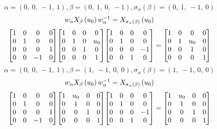 \documentclass[11pt]{article}
\theoremstyle{definition}
\begin{document}
\[
\alpha = \left( 0, \  0, \  -1, \  1\right), \beta = \left( 0, \  1, \  0, \  -1\right), \sigma_{\alpha}(\beta) = \left( 0, \  1, \  -1, \  0\right)
\]
\[
\scaletoalign{\textwidth}{w_{\alpha} X_{\beta}\left(u_{0}\right) w_{\alpha}^{-1} = X_{\sigma_{\alpha}\left(\beta\right)}\left(u_{0}\right)}
\]
\[
\scaletoalign{\textwidth}{{\left[\begin{matrix}1 & 0 & 0 & 0\\0 & 1 & 0 & 0\\0 & 0 & 0 & 1\\0 & 0 & -1 & 0\end{matrix}\right]} {\left[\begin{matrix}1 & 0 & 0 & 0\\0 & 1 & 0 & u_{0}\\0 & 0 & 1 & 0\\0 & 0 & 0 & 1\end{matrix}\right]} {\left[\begin{matrix}1 & 0 & 0 & 0\\0 & 1 & 0 & 0\\0 & 0 & 0 & -1\\0 & 0 & 1 & 0\end{matrix}\right]} = {\left[\begin{matrix}1 & 0 & 0 & 0\\0 & 1 & u_{0} & 0\\0 & 0 & 1 & 0\\0 & 0 & 0 & 1\end{matrix}\right]}}
\]
\[
\alpha = \left( 0, \  0, \  -1, \  1\right), \beta = \left( 1, \  -1, \  0, \  0\right), \sigma_{\alpha}(\beta) = \left( 1, \  -1, \  0, \  0\right)
\]
\[
\scaletoalign{\textwidth}{w_{\alpha} X_{\beta}\left(u_{0}\right) w_{\alpha}^{-1} = X_{\sigma_{\alpha}\left(\beta\right)}\left(u_{0}\right)}
\]
\[
\scaletoalign{\textwidth}{{\left[\begin{matrix}1 & 0 & 0 & 0\\0 & 1 & 0 & 0\\0 & 0 & 0 & 1\\0 & 0 & -1 & 0\end{matrix}\right]} {\left[\begin{matrix}1 & u_{0} & 0 & 0\\0 & 1 & 0 & 0\\0 & 0 & 1 & 0\\0 & 0 & 0 & 1\end{matrix}\right]} {\left[\begin{matrix}1 & 0 & 0 & 0\\0 & 1 & 0 & 0\\0 & 0 & 0 & -1\\0 & 0 & 1 & 0\end{matrix}\right]} = {\left[\begin{matrix}1 & u_{0} & 0 & 0\\0 & 1 & 0 & 0\\0 & 0 & 1 & 0\\0 & 0 & 0 & 1\end{matrix}\right]}}
\]
\end{document}
